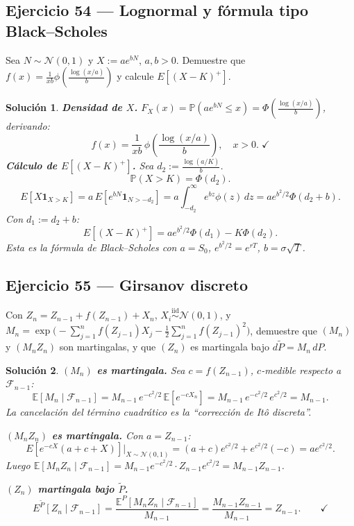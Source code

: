 \documentclass[12pt,letterpaper]{article}
\theoremstyle{ejercicio}
\theoremstyle{solucion}
\newtheorem*{solucion}{Solución}
\newcommand{\E}{\mathbb{E}}
\newcommand{\F}{\mathcal{F}}
\newcommand{\iid}{\overset{\text{iid}}{\sim}}
\renewcommand{\P}{\mathbb{P}}
\begin{document}
\subsection*{Ejercicio 54 — Lognormal y fórmula tipo Black–Scholes}

\begin{recuadro}
Sea $N\sim\mathcal{N}(0,1)$ y $X:=ae^{bN}$, $a,b>0$. Demuestre que
$f(x)=\frac{1}{xb}\phi\!\left(\frac{\log(x/a)}{b}\right)$ y calcule $E[(X-K)^+]$.
\end{recuadro}

\begin{solucion}
\textbf{Densidad de $X$.}
$F_X(x)=\P(ae^{bN}\le x)=\Phi\!\left(\frac{\log(x/a)}{b}\right)$, derivando:
\[
  f(x)=\frac{1}{xb}\,\phi\!\left(\frac{\log(x/a)}{b}\right),\quad x>0.\;\checkmark
\]
\textbf{Cálculo de $E[(X-K)^+]$.} Sea $d_2:=\frac{\log(a/K)}{b}$.
\[
  \P(X>K)=\Phi(d_2).
\]
\[
  E[X\mathbf{1}_{X>K}]=a\,E[e^{bN}\mathbf{1}_{N>-d_2}]
  =a\int_{-d_2}^\infty e^{bz}\phi(z)\,dz=ae^{b^2/2}\Phi(d_2+b).
\]
Con $d_1:=d_2+b$:
\[
  \boxed{E[(X-K)^+]=ae^{b^2/2}\Phi(d_1)-K\Phi(d_2).}
\]
Esta es la fórmula de Black–Scholes con $a=S_0$, $e^{b^2/2}=e^{rT}$, $b=\sigma\sqrt{T}$.
\end{solucion}

\subsection*{Ejercicio 55 — Girsanov discreto}

\begin{recuadro}
Con $Z_n=Z_{n-1}+f(Z_{n-1})+X_n$, $X_i\iid\mathcal{N}(0,1)$, y
$M_n=\exp\!\bigl(-\sum_{j=1}^n f(Z_{j-1})X_j-\frac{1}{2}\sum_{j=1}^n f(Z_{j-1})^2\bigr)$,
demuestre que $(M_n)$ y $(M_nZ_n)$ son martingalas, y que $(Z_n)$ es martingala bajo $d\tilde P=M_n\,dP$.
\end{recuadro}

\begin{solucion}
\textbf{$(M_n)$ es martingala.} Sea $c=f(Z_{n-1})$, $c$-medible respecto a $\F_{n-1}$:
\[
  \E[M_n\mid\F_{n-1}]=M_{n-1}\,e^{-c^2/2}\,\E[e^{-cX_n}]=M_{n-1}\,e^{-c^2/2}\,e^{c^2/2}=M_{n-1}.
\]
La cancelación del término cuadrático es la ``corrección de Itô discreta''.

\textbf{$(M_nZ_n)$ es martingala.} Con $a=Z_{n-1}$:
\[
  E[e^{-cX}(a+c+X)]\big|_{X\sim\mathcal{N}(0,1)}=(a+c)e^{c^2/2}+e^{c^2/2}(-c)=ae^{c^2/2}.
\]
Luego $\E[M_nZ_n\mid\F_{n-1}]=M_{n-1}e^{-c^2/2}\cdot Z_{n-1}e^{c^2/2}=M_{n-1}Z_{n-1}$.

\textbf{$(Z_n)$ martingala bajo $\tilde P$.}
\[
  E^{\tilde P}[Z_n\mid\F_{n-1}]=\frac{\E^P[M_nZ_n\mid\F_{n-1}]}{M_{n-1}}=\frac{M_{n-1}Z_{n-1}}{M_{n-1}}=Z_{n-1}.\qquad\checkmark
\]
\end{solucion}
\end{document}
